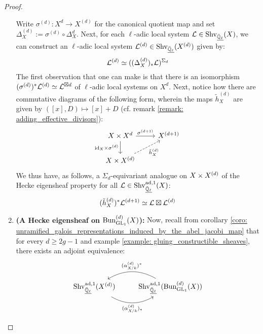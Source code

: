 \begin{proof}
\begin{enumerate}
                        Write $\sigma^{(d)}: X^d \to X^{(d)}$ for the canonical quotient map and set $\Delta_X^{(d)} := \sigma^{(d)} \circ \Delta_X^d$. Next, for each $\ell$-adic local system $\calL \in \Shv_{\underline{\bar{\Q}_{\ell}}}(X)$, we can construct an $\ell$-adic local system $\calL^{(d)} \in \Shv_{\underline{\bar{\Q}_{\ell}}}(X^{(d)})$ given by:
                            $$\calL^{(d)} \cong ((\Delta_X^{(d)})_*\calL)^{\Sigma_d}$$
                        The first observation that one can make is that there is an isomorphism $(\sigma^{(d)})^*\calL^{(d)} \cong \calL^{\boxtimes d}$ of $\ell$-adic local systems on $X^d$. Next, notice how there are commutative diagrams of the following form, wherein the maps $\tilde{h}_X^{(d)}$ are given by $([x], D) \mapsto [x] + D$ (cf. remark \ref{remark: adding_effective_divisors}):
                            $$
                                \begin{tikzcd}
                                	{X \x X^d} & {X^{(d + 1)}} \\
                                	{X \x X^{(d)}}
                                	\arrow["{\id_X \x \sigma^{(d)}}"', from=1-1, to=2-1]
                                	\arrow["{\tilde{h}_X^{(d)}}"', dashed, from=2-1, to=1-2]
                                	\arrow["{\sigma^{(d + 1)}}", from=1-1, to=1-2]
                                \end{tikzcd}
                            $$
                        We thus have, as follows, a $\Sigma_d$-equivariant analogue on $X \x X^{(d)}$ of the Hecke eigensheaf property for all $\calL \in \Shv_{\underline{\bar{\Q}_{\ell}}}^{\ad, 1}(X)$:
                            $$(\tilde{h}_X^{(d)})^* \calL^{(d + 1)} \cong \calL \boxtimes \calL^{(d)}$$
                        \item \textbf{(A Hecke eigensheaf on $\Bun_{\GL_1}^{(d)}(X)$):} Now, recall from corollary \ref{coro: unramified_galois_representations_induced_by_the_abel_jacobi_map} that for every $d \geq 2g - 1$ and example \ref{example: gluing_constructible_sheaves}, there exists an adjoint equivalence:
                            $$
                                \begin{tikzcd}
                                	{\Shv_{\underline{\bar{\Q}_{\ell}}}^{\ad, 1}(X^{(d)})} & {\Shv_{\underline{\bar{\Q}_{\ell}}}^{\ad, 1}(\Bun_{\GL_1}^{(d)}(X))}
                                	\arrow[""{name=0, anchor=center, inner sep=0}, "{(\alpha_{X/k}^{(d)})_*}"', bend right, from=1-1, to=1-2]
                                	\arrow[""{name=1, anchor=center, inner sep=0}, "{(\alpha_{X/k}^{(d)})^*}"', bend right, from=1-2, to=1-1]

\end{tikzcd}$$
\end{enumerate}
\end{proof}
